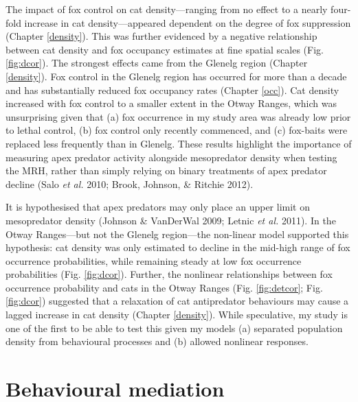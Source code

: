 \documentclass[11pt,a4paper,titlepage,twoside,openright]{style/unimelbthesis}
\begin{document}
\begin{mainmatter}
The impact of fox control on cat density---ranging from no effect to a nearly four-fold increase in cat density---appeared dependent on the degree of fox suppression (Chapter \ref{density}). This was further evidenced by a negative relationship between cat density and fox occupancy estimates at fine spatial scales (Fig. \ref{fig:dcor}). The strongest effects came from the Glenelg region (Chapter \ref{density}). Fox control in the Glenelg region has occurred for more than a decade and has substantially reduced fox occupancy rates (Chapter \ref{occ}). Cat density increased with fox control to a smaller extent in the Otway Ranges, which was unsurprising given that (a) fox occurrence in my study area was already low prior to lethal control, (b) fox control only recently commenced, and (c) fox-baits were replaced less frequently than in Glenelg. These results highlight the importance of measuring apex predator activity alongside mesopredator density when testing the MRH, rather than simply relying on binary treatments of apex predator decline (Salo \emph{et al.} 2010; Brook, Johnson, \& Ritchie 2012).

It is hypothesised that apex predators may only place an upper limit on mesopredator density (Johnson \& VanDerWal 2009; Letnic \emph{et al.} 2011). In the Otway Ranges---but not the Glenelg region---the non-linear model supported this hypothesis: cat density was only estimated to decline in the mid-high range of fox occurrence probabilities, while remaining steady at low fox occurrence probabilities (Fig. \ref{fig:dcor}). Further, the nonlinear relationships between fox occurrence probability and cats in the Otway Ranges (Fig. \ref{fig:detcor}; Fig. \ref{fig:dcor}) suggested that a relaxation of cat antipredator behaviours may cause a lagged increase in cat density (Chapter \ref{density}). While speculative, my study is one of the first to be able to test this given my models (a) separated population density from behavioural processes and (b) allowed nonlinear responses.

\hypertarget{behavioural-mediation}{%
\section{Behavioural mediation}\label{behavioural-mediation}}


\end{mainmatter}
\end{document}
